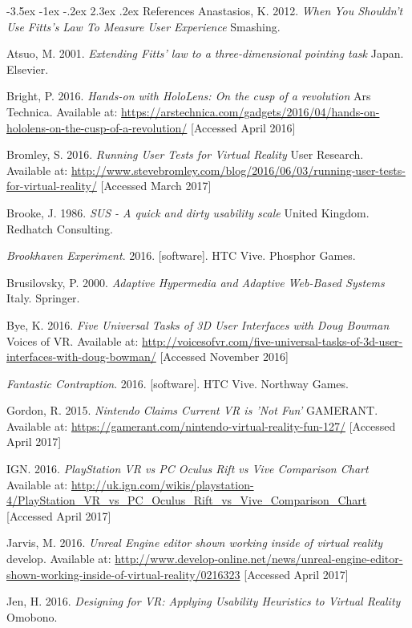 \documentclass[12pt]{article}
\makeatletter
\renewcommand{\section}{\@startsection {section}{1}{\z@}%
             {-3.5ex \@plus -1ex \@minus -.2ex}%
             {2.3ex \@plus .2ex}%
             {\normalfont\Large\scshape\bfseries}}
\makeatother
\begin{document}
\section{References}
Anastasios, K. 2012. \emph{When You Shouldn't Use Fitts's Law To Measure User Experience} Smashing. 

Atsuo, M. 2001. \emph{Extending Fitts' law to a three-dimensional pointing task} Japan. Elsevier. 

Bright, P. 2016. \emph{Hands-on with HoloLens: On the cusp of a revolution} Ars Technica. Available at: \url{https://arstechnica.com/gadgets/2016/04/hands-on-hololens-on-the-cusp-of-a-revolution/} [Accessed April 2016]

Bromley, S. 2016. \emph{Running User Tests for Virtual Reality} User Research. Available at: \url{http://www.stevebromley.com/blog/2016/06/03/running-user-tests-for-virtual-reality/} [Accessed March 2017]

Brooke, J. 1986. \emph{SUS - A quick and dirty usability scale} United Kingdom. Redhatch Consulting.

\emph{Brookhaven Experiment}. 2016. [software]. HTC Vive. Phosphor Games.

Brusilovsky, P. 2000. \emph{Adaptive Hypermedia and Adaptive Web-Based Systems} Italy. Springer.

Bye, K. 2016. \emph{Five Universal Tasks of 3D User Interfaces with Doug Bowman} Voices of VR. Available at: \url{http://voicesofvr.com/five-universal-tasks-of-3d-user-interfaces-with-doug-bowman/} [Accessed November 2016]

\emph{Fantastic Contraption}. 2016. [software]. HTC Vive. Northway Games.

Gordon, R. 2015. \emph{Nintendo Claims Current VR is 'Not Fun'} GAMERANT. Available at: \url{https://gamerant.com/nintendo-virtual-reality-fun-127/} [Accessed April 2017]

IGN. 2016. \emph{PlayStation VR vs PC Oculus Rift vs Vive Comparison Chart} Available at: \url{http://uk.ign.com/wikis/playstation-4/PlayStation_VR_vs_PC_Oculus_Rift_vs_Vive_Comparison_Chart} [Accessed April 2017]

Jarvis, M. 2016. \emph{Unreal Engine editor shown working inside of virtual reality} develop. Available at: \url{http://www.develop-online.net/news/unreal-engine-editor-shown-working-inside-of-virtual-reality/0216323} [Accessed April 2017]

Jen, H. 2016. \emph{Designing for VR: Applying Usability Heuristics to Virtual Reality} Omobono. 
\end{document}
